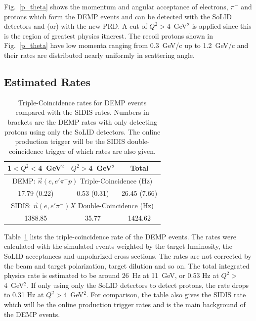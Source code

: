Fig.~\ref{p_theta} shows the momentum and angular acceptance of electrons,
$\pi^{-}$ and protons which form the DEMP events and can be detected with the
SoLID detectors and (or) with the new PRD.  A cut of $Q^{2}>$4~GeV$^{2}$
is applied since this is the region of greatest physics itnerest.  The recoil
protons shown in Fig.~\ref{p_theta} have low momenta ranging from 0.3~GeV/c up
to 1.2~GeV/c and their rates are distributed nearly uniformly in scattering
angle.

\subsection{Estimated Rates}

\begin{table}[!ht]
\centering
\begin{tabular}{|c|c|c|}
 \hline
  1$<Q^{2}<$4~GeV$^{2}$ & $Q^{2}>$4~GeV$^{2}$ & Total\\
 \hline
\multicolumn{3}{|c|}{DEMP: $\vec{n}(e,e'\pi^{-}p)$ Triple-Coincidence (Hz)}\\
 \hline
 17.79 (0.22)   &  0.53 (0.31) & 26.45 (7.66)   \\
 \hline
\multicolumn{3}{|c|}{SIDIS: $\vec{n}(e,e'\pi^{-})X$ Double-Coincidence (Hz)}\\
 \hline
        1388.85 & 35.77        & 1424.62   \\
 \hline
\end{tabular}
\caption[Triple-Coincidence rates for
  neutron-DEMP]{\footnotesize{Triple-Coincidence rates for DEMP events compared
    with the SIDIS rates. Numbers in brackets are the DEMP rates with only
    detecting protons using only the SoLID detectors. The online production
    trigger will be the SIDIS double-coincidence trigger of which rates are
    also given.}}
\label{rate_table}
\end{table} 

Table~\ref{rate_table} lists the triple-coincidence rate of the DEMP
events. The rates were calculated with the simulated events weighted by the
target luminosity, the SoLID acceptances and unpolarized cross sections. The
rates are not corrected by the beam and target polarization, target dilution
and so on. The total integrated physics rate is estimated to be around 26~Hz at
11~GeV, or 0.53 Hz at $Q^{2}>$4~GeV$^{2}$. If only using only the 
SoLID detectors to detect protons, the rate drops to 0.31 Hz at
$Q^{2}>$4~GeV$^{2}$.  For comparison, the table also gives the SIDIS rate
which will be the online production trigger rates and is the main background of
the DEMP events.

